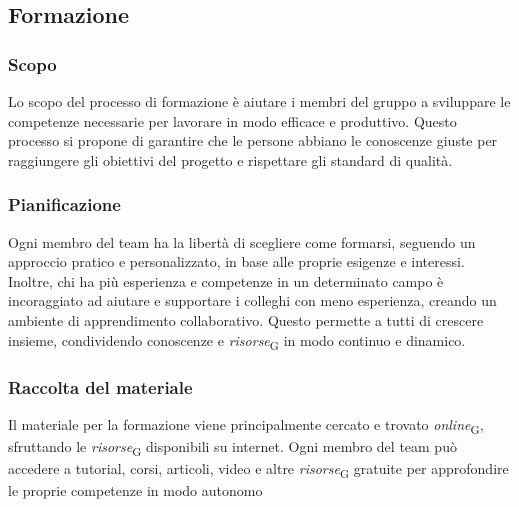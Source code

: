 \subsection{Formazione}
\subsubsection{Scopo}
Lo scopo del processo di formazione è aiutare i membri del gruppo a sviluppare le competenze necessarie per lavorare in modo efficace e produttivo. Questo processo si propone di garantire che le persone abbiano le conoscenze giuste per raggiungere gli obiettivi del progetto e rispettare gli standard di qualità.

\subsubsection{Pianificazione}
Ogni membro del team ha la libertà di scegliere come formarsi, seguendo un approccio pratico e personalizzato, in base alle proprie esigenze e interessi. Inoltre, chi ha più esperienza e competenze in un determinato campo è incoraggiato ad aiutare e supportare i colleghi con meno esperienza, creando un ambiente di apprendimento collaborativo. Questo permette a tutti di crescere insieme, condividendo conoscenze e \textit{risorse}\textsubscript{G} in modo continuo e dinamico.

\subsubsection{Raccolta del materiale}
Il materiale per la formazione viene principalmente cercato e trovato \textit{online}\textsubscript{G}, sfruttando le \textit{risorse}\textsubscript{G} disponibili su internet. Ogni membro del team può accedere a tutorial, corsi, articoli, video e altre \textit{risorse}\textsubscript{G} gratuite per approfondire le proprie competenze in modo autonomo